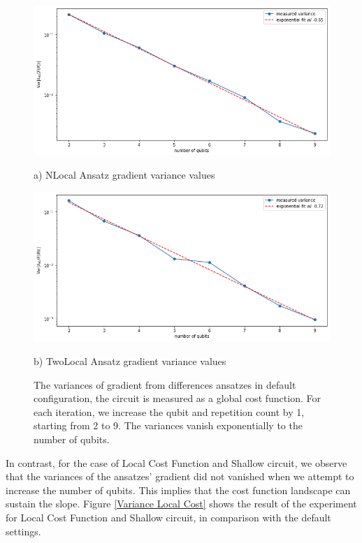 \begin{figure}
    \includegraphics[width=\textwidth]{Artefact/Appendices/NLocalDefault.png}
    \centerline{a) NLocal Ansatz gradient variance values}
    \includegraphics[width=\textwidth]{Artefact/Appendices/TwoLocalDefault.png}
    \centerline{b) TwoLocal Ansatz gradient variance values}
    \caption{
        The variances of gradient from differences ansatzes in default configuration, the circuit is measured as a global cost function.
        For each iteration, we increase the qubit and repetition count by 1, starting from 2 to 9.
        The variances vanish exponentially to the number of qubits.
    }
    \label{Plot ansatzes gradients default}
\end{figure}

In contrast, for the case of Local Cost Function and Shallow circuit, we observe that the variances of the ansatzes' gradient did not vanished when we attempt to increase the number of qubits.
This implies that the cost function landscape can sustain the slope.
Figure \ref{Variance Local Cost} shows the result of the experiment for Local Cost Function and Shallow circuit, in comparison with the default settings.

